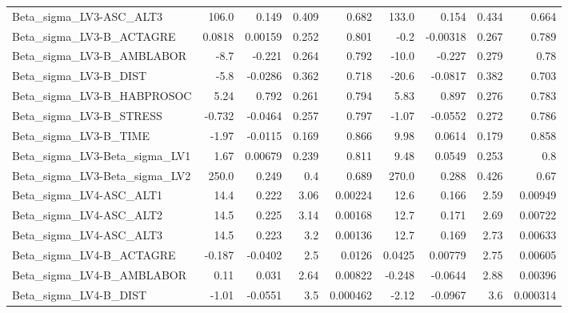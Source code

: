 \begin{tabular}{lrrrrrrrr}
Beta\_sigma\_LV3-ASC\_ALT3       &       106.0 &        0.149 &   0.409 &    0.682 &      133.0 &       0.154 &        0.434 &         0.664 \\
Beta\_sigma\_LV3-B\_ACTAGRE      &      0.0818 &      0.00159 &   0.252 &    0.801 &       -0.2 &    -0.00318 &        0.267 &         0.789 \\
Beta\_sigma\_LV3-B\_AMBLABOR     &        -8.7 &       -0.221 &   0.264 &    0.792 &      -10.0 &      -0.227 &        0.279 &          0.78 \\
Beta\_sigma\_LV3-B\_DIST         &        -5.8 &      -0.0286 &   0.362 &    0.718 &      -20.6 &     -0.0817 &        0.382 &         0.703 \\
Beta\_sigma\_LV3-B\_HABPROSOC    &        5.24 &        0.792 &   0.261 &    0.794 &       5.83 &       0.897 &        0.276 &         0.783 \\
Beta\_sigma\_LV3-B\_STRESS       &      -0.732 &      -0.0464 &   0.257 &    0.797 &      -1.07 &     -0.0552 &        0.272 &         0.786 \\
Beta\_sigma\_LV3-B\_TIME         &       -1.97 &      -0.0115 &   0.169 &    0.866 &       9.98 &      0.0614 &        0.179 &         0.858 \\
Beta\_sigma\_LV3-Beta\_sigma\_LV1 &        1.67 &      0.00679 &   0.239 &    0.811 &       9.48 &      0.0549 &        0.253 &           0.8 \\
Beta\_sigma\_LV3-Beta\_sigma\_LV2 &       250.0 &        0.249 &     0.4 &    0.689 &      270.0 &       0.288 &        0.426 &          0.67 \\
Beta\_sigma\_LV4-ASC\_ALT1       &        14.4 &        0.222 &    3.06 &  0.00224 &       12.6 &       0.166 &         2.59 &       0.00949 \\
Beta\_sigma\_LV4-ASC\_ALT2       &        14.5 &        0.225 &    3.14 &  0.00168 &       12.7 &       0.171 &         2.69 &       0.00722 \\
Beta\_sigma\_LV4-ASC\_ALT3       &        14.5 &        0.223 &     3.2 &  0.00136 &       12.7 &       0.169 &         2.73 &       0.00633 \\
Beta\_sigma\_LV4-B\_ACTAGRE      &      -0.187 &      -0.0402 &     2.5 &   0.0126 &     0.0425 &     0.00779 &         2.75 &       0.00605 \\
Beta\_sigma\_LV4-B\_AMBLABOR     &        0.11 &        0.031 &    2.64 &  0.00822 &     -0.248 &     -0.0644 &         2.88 &       0.00396 \\
Beta\_sigma\_LV4-B\_DIST         &       -1.01 &      -0.0551 &     3.5 & 0.000462 &      -2.12 &     -0.0967 &          3.6 &      0.000314 \\

\end{tabular}
